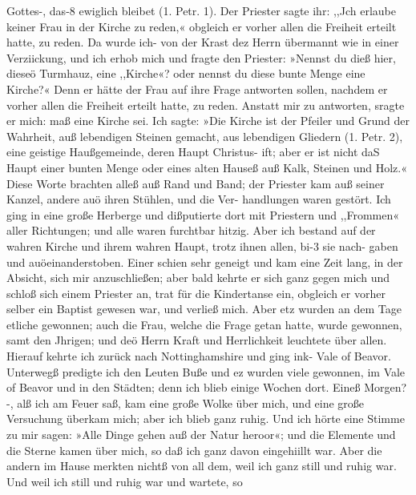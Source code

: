 Gottes-, das-8 ewiglich bleibet (1. Petr. 1). Der Priester sagte ihr:
,,Jch erlaube keiner Frau in der Kirche zu reden,« obgleich er
vorher allen die Freiheit erteilt hatte, zu reden. Da wurde ich-
von der Krast dez Herrn übermannt wie in einer Verziickung,
und ich erhob mich und fragte den Priester: »Nennst du dieß
hier, dieseö Turmhauz, eine ,,Kirche«? oder nennst du diese
bunte Menge eine Kirche?« Denn er hätte der Frau auf ihre
Frage antworten sollen, nachdem er vorher allen die Freiheit
erteilt hatte, zu reden. Anstatt mir zu antworten, sragte er mich:
maß eine Kirche sei. Ich sagte: »Die Kirche ist der Pfeiler und
Grund der Wahrheit, auß lebendigen Steinen gemacht, aus
lebendigen Gliedern (1. Petr. 2), eine geistige Haußgemeinde,
deren Haupt Christus- ift; aber er ist nicht daS Haupt einer bunten
Menge oder eines alten Hauseß auß Kalk, Steinen und Holz.«
Diese Worte brachten alleß auß Rand und Band; der Priester
kam auß seiner Kanzel, andere auö ihren Stühlen, und die Ver-
handlungen waren gestört. Ich ging in eine große Herberge und
dißputierte dort mit Priestern und ,,Frommen« aller Richtungen;
und alle waren furchtbar hitzig. Aber ich bestand auf der wahren
Kirche und ihrem wahren Haupt, trotz ihnen allen, bi-3 sie nach-
gaben und auöeinanderstoben. Einer schien sehr geneigt und kam
eine Zeit lang, in der Absicht, sich mir anzuschließen; aber bald
kehrte er sich ganz gegen mich und schloß sich einem Priester an,
trat für die Kindertanse ein, obgleich er vorher selber ein
Baptist gewesen war, und verließ mich. Aber etz wurden an dem
Tage etliche gewonnen; auch die Frau, welche die Frage getan
hatte, wurde gewonnen, samt den Jhrigen; und deö Herrn Kraft
und Herrlichkeit leuchtete über allen.
Hierauf kehrte ich zurück nach Nottinghamshire und ging
ink- Vale of Beavor. Unterwegß predigte ich den Leuten Buße
und ez wurden viele gewonnen, im Vale of Beavor und in den
Städten; denn ich blieb einige Wochen dort. Eineß Morgen?-,
alß ich am Feuer saß, kam eine große Wolke über mich, und eine
große Versuchung überkam mich; aber ich blieb ganz ruhig. Und
ich hörte eine Stimme zu mir sagen: »Alle Dinge gehen auß der
Natur heroor«; und die Elemente und die Sterne kamen über
mich, so daß ich ganz davon eingehiillt war. Aber die andern
im Hause merkten nichtß von all dem, weil ich ganz still und
ruhig war. Und weil ich still und ruhig war und wartete, so



